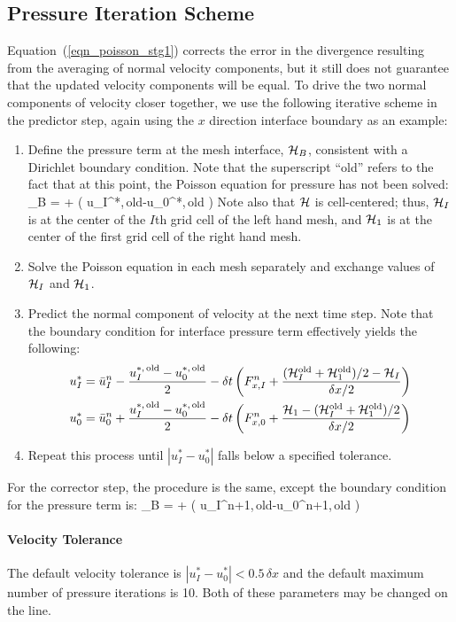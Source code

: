 \subsection{Pressure Iteration Scheme}
\label{section:pressure_iteration}

Equation~(\ref{eqn_poisson_stg1}) corrects the error in the divergence resulting from the averaging of normal velocity components, but it still does not guarantee that the
updated velocity components will be equal. To drive the two normal components of velocity closer together, we use the
following iterative scheme in the predictor step, again using the $x$ direction interface boundary as an example:
\begin{enumerate}
\item Define the pressure term at the mesh interface, $\mathcal{H}_B$, consistent with a Dirichlet boundary condition. Note that the superscript ``old'' refers to the fact that at this point, the Poisson equation for pressure has not been solved:
\be
   \cH_B =  +  \left( u_I^{*,\,{\rm old}}-u_0^{*,\,{\rm old}} \right)
\ee
Note also that $\mathcal{H}$ is cell-centered; thus, $\mathcal{H}_I$ is at the center of the $I$th grid cell of the left hand mesh, and $\mathcal{H}_1$ is at the center of the first grid cell of the right hand mesh.
\item Solve the Poisson equation in each mesh separately and exchange values of $\mathcal{H}_I$ and $\mathcal{H}_1$.
\item Predict the normal component of velocity at the next time step. Note that the boundary condition for interface pressure term effectively yields the following:
\begin{align}
   u_I^* &= \bar{u}_I^n - \frac{u_I^{\rm *,\, old}-u_0^{\rm *,\, old}}{2} - \delta t \left( F_{x,I}^{n} + \frac{ (\mathcal{H}_I^{\rm old}+\mathcal{H}_1^{\rm old})/2 - \mathcal{H}_I }{ \delta x/2} \right) \label{uI} \\
   u_0^* &= \bar{u}_0^n + \frac{u_I^{\rm *,\, old}-u_0^{\rm *,\, old}}{2} - \delta t \left( F_{x,0}^{n} + \frac{ \mathcal{H}_1 - (\mathcal{H}_I^{\rm old}+\mathcal{H}_1^{\rm old})/2 }{ \delta x/2} \right) \label{u0}
\end{align}
\item Repeat this process until $\left| u_I^* - u_0^* \right|$ falls below a specified tolerance.
\end{enumerate}
For the corrector step, the procedure is the same, except the boundary condition for the pressure term is:
\be
   \cH_B =  +  \left( u_I^{n+1,\,{\rm old}}-u_0^{n+1,\,{\rm old}} \right)
\ee

\paragraph{Velocity Tolerance} The default velocity tolerance is $\left| u_I^* - u_0^* \right| < 0.5 \, \delta x$ and the default maximum number of pressure iterations is 10.  Both of these parameters may be changed on the  line.




